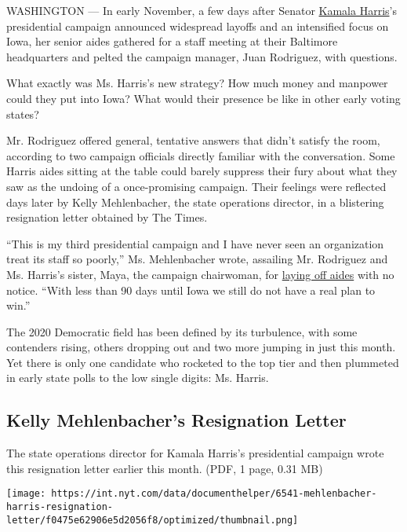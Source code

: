 WASHINGTON --- In early November, a few days after Senator
\href{https://www.nytimes.com/2020/05/11/us/politics/kamala-harris-biden-vp.html}{Kamala
Harris}'s presidential campaign announced widespread layoffs and an
intensified focus on Iowa, her senior aides gathered for a staff meeting
at their Baltimore headquarters and pelted the campaign manager, Juan
Rodriguez, with questions.

What exactly was Ms. Harris's new strategy? How much money and manpower
could they put into Iowa? What would their presence be like in other
early voting states?

Mr. Rodriguez offered general, tentative answers that didn't satisfy the
room, according to two campaign officials directly familiar with the
conversation. Some Harris aides sitting at the table could barely
suppress their fury about what they saw as the undoing of a
once-promising campaign. Their feelings were reflected days later by
Kelly Mehlenbacher, the state operations director, in a blistering
resignation letter obtained by The Times.

``This is my third presidential campaign and I have never seen an
organization treat its staff so poorly,'' Ms. Mehlenbacher wrote,
assailing Mr. Rodriguez and Ms. Harris's sister, Maya, the campaign
chairwoman, for
\href{https://www.nytimes.com/2019/10/30/us/politics/kamala-harris-campaign.html}{laying
off aides} with no notice. ``With less than 90 days until Iowa we still
do not have a real plan to win.''

The 2020 Democratic field has been defined by its turbulence, with some
contenders rising, others dropping out and two more jumping in just this
month. Yet there is only one candidate who rocketed to the top tier and
then plummeted in early state polls to the low single digits: Ms.
Harris.

\hypertarget{kelly-mehlenbachers-resignation-letter}{%
\subsection{Kelly Mehlenbacher's Resignation
Letter}\label{kelly-mehlenbachers-resignation-letter}}

The state operations director for Kamala Harris's presidential campaign
wrote this resignation letter earlier this month. (PDF, 1 page, 0.31 MB)

\texttt{[image: https://int.nyt.com/data/documenthelper/6541-mehlenbacher-harris-resignation-letter/f0475e62906e5d2056f8/optimized/thumbnail.png]}

